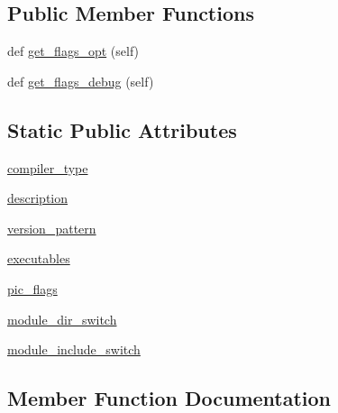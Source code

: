 \subsection*{Public Member Functions}
\begin{DoxyCompactItemize}
\item 
def \hyperlink{classnumpy_1_1distutils_1_1fcompiler_1_1pathf95_1_1PathScaleFCompiler_abb47a14e5dd60043375ace5719a9961c}{get\+\_\+flags\+\_\+opt} (self)
\item 
def \hyperlink{classnumpy_1_1distutils_1_1fcompiler_1_1pathf95_1_1PathScaleFCompiler_a99eb407f2e4c6194d4c76484605d5939}{get\+\_\+flags\+\_\+debug} (self)
\end{DoxyCompactItemize}
\subsection*{Static Public Attributes}
\begin{DoxyCompactItemize}
\item 
\hyperlink{classnumpy_1_1distutils_1_1fcompiler_1_1pathf95_1_1PathScaleFCompiler_a836d27152c2a0ca708e05bd4c06cb502}{compiler\+\_\+type}
\item 
\hyperlink{classnumpy_1_1distutils_1_1fcompiler_1_1pathf95_1_1PathScaleFCompiler_afba670192353207e666f647124f7b9ed}{description}
\item 
\hyperlink{classnumpy_1_1distutils_1_1fcompiler_1_1pathf95_1_1PathScaleFCompiler_a27c1f5d21d56d58ff6d8642266266291}{version\+\_\+pattern}
\item 
\hyperlink{classnumpy_1_1distutils_1_1fcompiler_1_1pathf95_1_1PathScaleFCompiler_a0210602f82b9b87cd2138c7f17e57141}{executables}
\item 
\hyperlink{classnumpy_1_1distutils_1_1fcompiler_1_1pathf95_1_1PathScaleFCompiler_a170ef05c96e545c3904b35a8e9793bc6}{pic\+\_\+flags}
\item 
\hyperlink{classnumpy_1_1distutils_1_1fcompiler_1_1pathf95_1_1PathScaleFCompiler_a2f0d01591d769671bc8e79c1bf320f56}{module\+\_\+dir\+\_\+switch}
\item 
\hyperlink{classnumpy_1_1distutils_1_1fcompiler_1_1pathf95_1_1PathScaleFCompiler_a39b8488283b8e7f91ef59b50fd83efde}{module\+\_\+include\+\_\+switch}
\end{DoxyCompactItemize}


\subsection{Member Function Documentation}
\mbox{\label{classnumpy_1_1distutils_1_1fcompiler_1_1pathf95_1_1PathScaleFCompiler_a99eb407f2e4c6194d4c76484605d5939}} 
